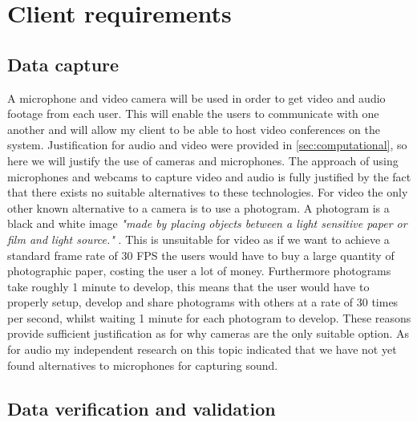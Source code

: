 \section{Client requirements}

\subsection{Data capture}

A microphone and video camera will be used in order to get 
video and audio footage from each user. This will enable the 
users to communicate with one another and will allow my client
to be able to host video conferences on the system. 
Justification for audio and video were provided in 
\ref{sec:computational}, so here we will justify the use of 
cameras and microphones. The approach of using microphones and
webcams to capture video and audio is fully justified by the
fact that there exists no suitable alternatives to these 
technologies. For video the only other known alternative to a
camera is to use a photogram. A photogram is a black and white
image \textit{"made by placing objects between a light 
sensitive paper or film and light source."} \cite{photo}. This
is unsuitable for video as if we want to achieve a standard
frame rate of 30 FPS the users would have to buy a large
quantity of photographic paper, costing the user a lot of
money. Furthermore photograms take roughly 1 minute to
develop, this means that the user would have to properly setup,
develop and share photograms with others at a rate of 30 times
per second, whilst waiting 1 minute for each photogram to
develop. These reasons provide sufficient justification as for
why cameras are the only suitable option. As for audio my 
independent research on this topic indicated that we have not
yet found alternatives to microphones for capturing sound. 

\subsection{Data verification and validation}

